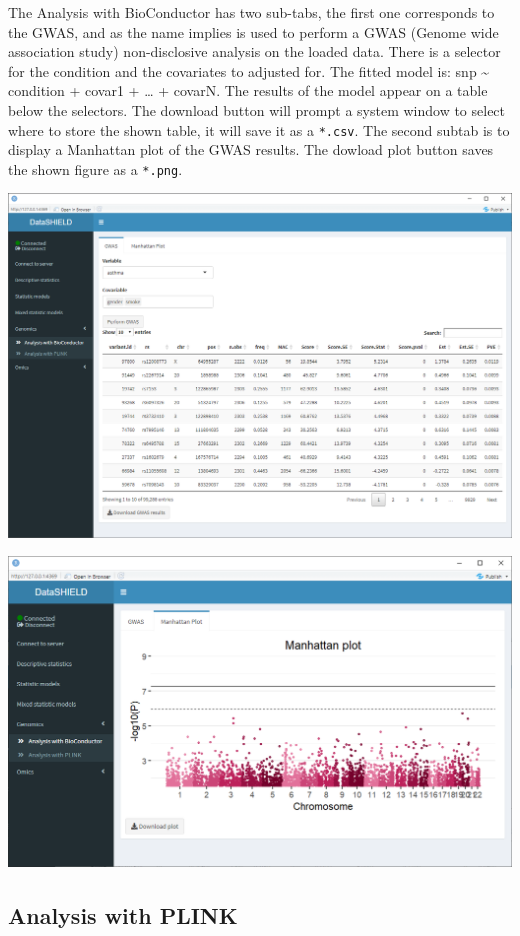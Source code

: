\documentclass[
]{book}
\begin{document}
The Analysis with BioConductor has two sub-tabs, the first one corresponds to the GWAS, and as the name implies is used to perform a GWAS (Genome wide association study) non-disclosive analysis on the loaded data. There is a selector for the condition and the covariates to adjusted for. The fitted model is: snp \textasciitilde{} condition + covar1 + \ldots{} + covarN. The results of the model appear on a table below the selectors. The download button will prompt a system window to select where to store the shown table, it will save it as a \texttt{*.csv}. The second subtab is to display a Manhattan plot of the GWAS results. The dowload plot button saves the shown figure as a \texttt{*.png}.

\includegraphics{images/genomics1.png}

\includegraphics{images/genomics2.png}

\hypertarget{analysis-with-plink}{%
\subsection{Analysis with PLINK}\label{analysis-with-plink}}
\end{document}
